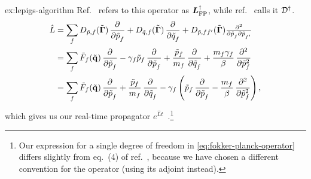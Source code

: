 \begin{DefAnswer}{ex:lepigs-algorithm}
{	Ref.~\cite[83]{risken1984fokker} refers to this operator as $\boldsymbol{L}_\mathrm{FP}^\dagger$, while ref.~\cite[42-43]{zwanzig2001nonequilibrium} calls it $\mathcal{D}^\dagger$.
	}
	\begin{subequations}
	\begin{align}
		\hat{L}
		&= \sum_f
			D_{\nm{p},f}(\nm{\vec{\Gamma}}) \dpd{}{\nm{p}_f}
			+ D_{\nm{q},f}(\nm{\vec{\Gamma}}) \dpd{}{\nm{q}_f}
			+ D_{\nm{p},ff'}(\nm{\vec{\Gamma}}) \md{}{2}{\nm{p}_f}{}{\nm{p}_{f'}}{} \\
		&= \sum_f
			\nm{F}_f(\nm{\vec{q}}) \dpd{}{\nm{p}_f} - \gamma_f \nm{p}_f \dpd{}{\nm{p}_f}
			+ \frac{\nm{p}_f}{m_f} \dpd{}{\nm{q}_f}
			+ \frac{m_f \gamma_f}{\beta} \dpd[2]{}{\nm{p}_f} \\
		&= \sum_f
			\nm{F}_f(\nm{\vec{q}}) \dpd{}{\nm{p}_f}
			+ \frac{\nm{p}_f}{m_f} \dpd{}{\nm{q}_f}
			- \gamma_f \left( \nm{p}_f \dpd{}{\nm{p}_f} - \frac{m_f}{\beta} \dpd[2]{}{\nm{p}_f} \right),
				\label{eq:fokker-planck-operator}
	\end{align}
	\end{subequations}
	which gives us our real-time propagator $e^{\hat{L} t}$~\cite[42-43]{zwanzig2001nonequilibrium}.\footnote{
		Our expression for a single degree of freedom in \cref{eq:fokker-planck-operator} differs slightly from eq.~(4) of ref.~\cite{bussi2007accurate}, because we have chosen a different convention for the operator (using its adjoint instead).
	}


\end{DefAnswer}
